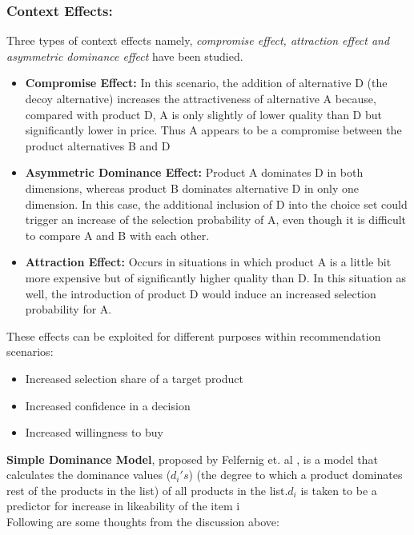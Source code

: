 \documentclass{llncs}
\begin{document}
\subsubsection{Context Effects:}
Three types of context effects namely, \textit{compromise effect, attraction effect and asymmetric dominance effect} have been studied.
\begin{itemize}
\renewcommand{\labelitemi}{$\bullet$}
\item \textbf{Compromise Effect:} In this scenario, the addition of alternative D (the decoy alternative) increases the attractiveness of alternative A because, compared with product D, A is only slightly of lower quality than D but significantly lower in price.
Thus A appears to be a compromise between the product alternatives B and D
\item \textbf{Asymmetric Dominance Effect:} Product A dominates D in both dimensions, whereas product B dominates alternative D in only one dimension.
In this case, the additional inclusion of D into the choice set could trigger an increase of the selection probability of A, even though it is difficult to compare A and B with each other. 

\item \textbf{Attraction Effect:} Occurs in situations in which product A is a little bit more expensive but of significantly higher quality than D. 
In this situation as well, the introduction of product D would induce an increased selection probability for A.


\end{itemize}
These effects can be exploited for different purposes within recommendation scenarios:
\begin{itemize}
\renewcommand{\labelitemi}{$\bullet$}
\item {Increased selection share of a target product} 
\item {Increased confidence in a decision}
\item {Increased willingness to buy}
\end{itemize}
\textbf{Simple Dominance Model}, proposed by Felfernig et. al \cite{felfernig}, is a model that calculates the dominance values ($d_i's$) (the degree to which a product dominates rest of the products in the list) of all products in the list.$d_i$ is taken to be a predictor for increase in likeability of the item i\\
Following are some thoughts from the discussion above:
\end{document}
